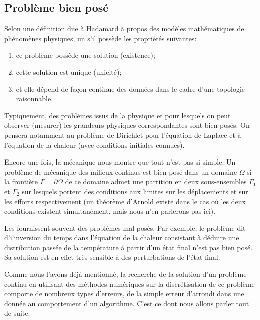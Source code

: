 \subsection{Problème bien posé}
Selon une définition due à Hadamard à propos des
modèles mathématiques de phénomènes physiques, un  s'il possède les propriétés
suivantes:
\begin{enumerate}
   \item ce problème possède une solution (existence);
   \item cette solution est unique (unicité);
   \item et elle dépend de façon continue des données dans le cadre d'une topologie raisonnable.
\end{enumerate}

\medskip
Typiquement, des problèmes issus de la physique et pour lesquels on peut observer (mesurer) les grandeurs physiques correspondantes
sont bien posés. On pensera notamment au problème de Dirichlet pour l'équation de Laplace et à l'équation de la chaleur (avec conditions
initiales connues).

\medskip
Encore une fois, la mécanique nous montre que tout n'est pas si simple.
Un problème de mécanique des milieux continus est bien posé dans un domaine $\Omega$ si la frontière $\Gamma=\partial\Omega$ de
ce domaine admet une partition en deux sous-ensembles $\Gamma_1$ et $\Gamma_2$ sur lesquels portent des conditions aux limites
sur les déplacements et sur les efforts respectivement (un théorème d'Arnold existe
dans le cas où les deux conditions existent simultanément, mais nous n'en parlerons pas ici).


\medskip
Les  fournissent souvent des problèmes mal posés.
Par exemple, le problème dit d'i'inversion du temps dans l'équation de la chaleur consistant à déduire une distribution passée de la
température à partir d'un état final n'est pas bien posé. Sa solution est en effet très sensible à des perturbations de l'état final.

\medskip
Comme nous l'avons déjà mentionné, la recherche de la solution d'un problème continu en utilisant des méthodes numériques sur la
discrétisation de ce problème comporte de nombreux types d'erreurs, de la simple erreur d'arrondi dans une donnée au comportement
d'un algorithme. C'est ce dont nous allons parler tout de suite.


